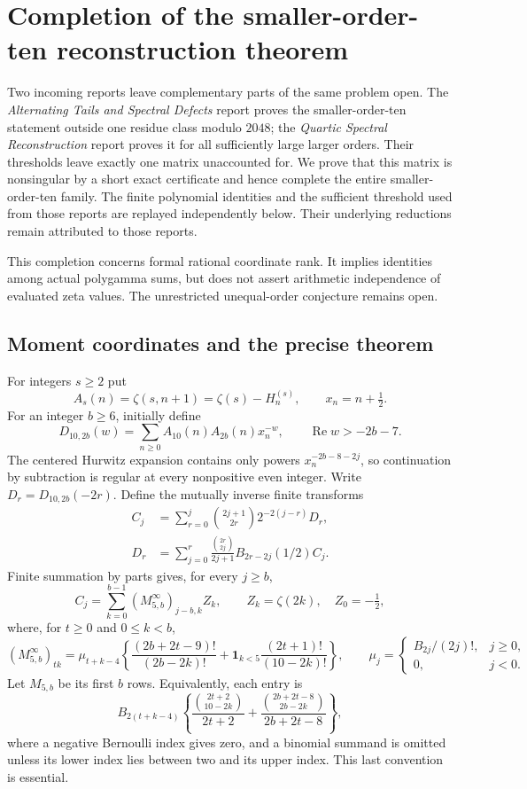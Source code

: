 \documentclass[11pt,a4paper]{article}
\numberwithin{equation}{section}
\theoremstyle{definition}
\theoremstyle{remark}
\begin{document}
\section{Completion of the smaller-order-ten reconstruction theorem}
\label{mt10:section}

Two incoming reports leave complementary parts of the same problem open.
The \emph{Alternating Tails and Spectral Defects} report \cite{RepoAlternating} proves the
smaller-order-ten statement outside one residue class modulo $2048$;
the \emph{Quartic Spectral Reconstruction} report \cite{RepoQuartic} proves it for all
sufficiently large larger orders. Their thresholds leave exactly one
matrix unaccounted for. We prove that this matrix is nonsingular by a
short exact certificate and hence complete the entire smaller-order-ten
family. The finite polynomial identities and the sufficient threshold
used from those reports are replayed independently below. Their
underlying reductions remain attributed to those reports.

This completion concerns formal rational coordinate rank. It implies
identities among actual polygamma sums, but does not assert arithmetic
independence of evaluated zeta values. The unrestricted unequal-order
conjecture remains open.

\subsection{Moment coordinates and the precise theorem}

For integers $s\ge2$ put
\[
 A_s(n)=\zeta(s,n+1)=\zeta(s)-H_n^{(s)},\qquad x_n=n+\tfrac12.
\]
For an integer $b\ge6$, initially define
\[
 D_{10,2b}(w)=\sum_{n\ge0}A_{10}(n)A_{2b}(n)x_n^{-w},
 \qquad \operatorname{Re}w>-2b-7.
\]
The centered Hurwitz expansion contains only powers
$x_n^{-2b-8-2j}$, so continuation by subtraction is regular at every
nonpositive even integer. Write $D_r=D_{10,2b}(-2r)$. Define the
mutually inverse finite transforms
\begin{align}
 C_j&=\sum_{r=0}^j\binom{2j+1}{2r}2^{-2(j-r)}D_r,
 \label{mt10:C}\\
 D_r&=\sum_{j=0}^r\frac{\binom{2r}{2j}}{2j+1}
                 B_{2r-2j}(1/2)C_j.\label{mt10:D}
\end{align}
Finite summation by parts gives, for every $j\ge b$,
\[
 C_j=\sum_{k=0}^{b-1}(M^{\infty}_{5,b})_{j-b,k}Z_k,
 \qquad Z_k=\zeta(2k),\quad Z_0=-\tfrac12,
\]
where, for $t\ge0$ and $0\le k<b$,
\begin{equation}\label{mt10:M}
 (M^{\infty}_{5,b})_{tk}
 =\mu_{t+k-4}\left\{
 \frac{(2b+2t-9)!}{(2b-2k)!}
 +\mathbf1_{k<5}\frac{(2t+1)!}{(10-2k)!}\right\},
 \qquad
 \mu_j=\begin{cases}B_{2j}/(2j)!,&j\ge0,\\0,&j<0.\end{cases}
\end{equation}
Let $M_{5,b}$ be its first $b$ rows. Equivalently, each entry is
\[
 B_{2(t+k-4)}\left\{
 \frac{\binom{2t+2}{10-2k}}{2t+2}
 +\frac{\binom{2b+2t-8}{2b-2k}}{2b+2t-8}\right\},
\]
where a negative Bernoulli index gives zero, and a binomial summand
is omitted unless its lower index lies between two and its upper
index. This last convention is essential.
\end{document}
